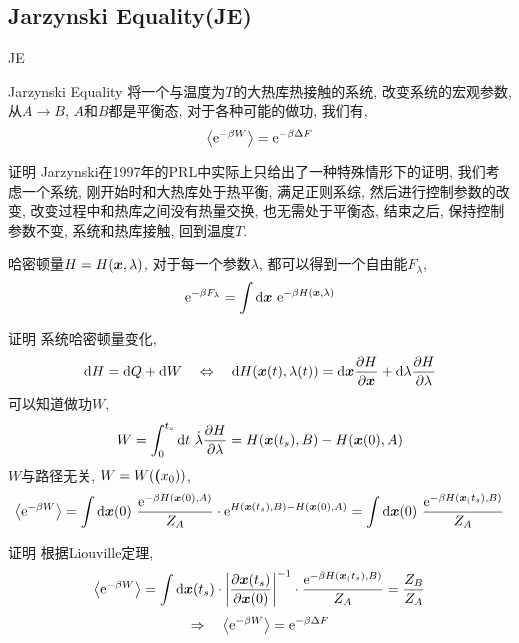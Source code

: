     \subsection{Jarzynski Equality(JE)}
    \begin{frame}{JE}
        \begin{alertblock}{Jarzynski Equality}
            将一个与温度为$T$的大热库热接触的系统, 改变系统的宏观参数, 从$A\to B$, $A$和$B$都是平衡态, 对于各种可能的做功, 我们有,
            \begin{equation}
                \expval{\mathrm{e}^{-\beta W}} = \mathrm{e}^{-\beta \Delta F}
            \end{equation}
        \end{alertblock}   
    \end{frame}
    \begin{frame}{证明}
        Jarzynski在1997年的PRL中实际上只给出了一种特殊情形下的证明, 我们考虑一个系统, 刚开始时和大热库处于热平衡, 满足正则系综, 然后进行控制参数的改变, 改变过程中和热库之间没有热量交换, 也无需处于平衡态, 结束之后, 保持控制参数不变, 系统和热库接触, 回到温度$T$. 
        
        哈密顿量$H = H(\vb*x,\lambda)$, 对于每一个参数$\lambda$, 都可以得到一个自由能$F_\lambda$,
        \begin{equation}
            \ee^{-\beta F_\lambda} = \int\dd\vb*x\ \ee^{-\beta H(\vb*x, \lambda)}
        \end{equation}
    \end{frame}
    \begin{frame}{证明}
        系统哈密顿量变化,
        \begin{equation}
            \dd H = \dd Q + \dd W \quad\Leftrightarrow\quad \dd{H(\vb*x(t),\lambda(t))} = \dd\vb*x\pdv{H}{\vb*x}  + \dd\lambda\pdv{H}{\lambda}
        \end{equation}
        可以知道做功$W$,
        \begin{equation}
            W = \int_0^{t_s} \dd t\ \dot\lambda\pdv{H}{\lambda} = H(\vb*x(t_s),B) - H(\vb*x(0),A)
        \end{equation}
        $W$与路径无关, $W = W(\vb*(x_0))$,
        \begin{equation}
            \expval{\ee^{-\beta W}} = \int \dd\vb*x(0)\ \frac{\ee^{-\beta H(\vb*x(0),A)}}{Z_A} \cdot \ee^{H(\vb*x(t_s),B) - H(\vb*x(0),A)} = \int  \dd\vb*x(0)\ \frac{\ee^{-\beta H(\vb*x_(t_s),B)}}{Z_A}
        \end{equation}
    \end{frame}
    \begin{frame}{证明}
        根据Liouville定理,
        \begin{equation*}
            \expval{\mathrm{e}^{-\beta W}} = \int \dd\vb*x(t_s) \cdot \left|\pdv{\vb*x(t_s)}{\vb*x(0)}\right|^{-1} \cdot \frac{\mathrm{e}^{-\beta H(\vb*x_(t_s),B)}}{Z_A} = \frac{Z_B}{Z_A}
        \end{equation*}
        \begin{equation}
            \Rightarrow\quad \expval{\mathrm{e}^{-\beta W}} = \mathrm{e}^{-\beta \Delta F}
        \end{equation}
    \end{frame}

